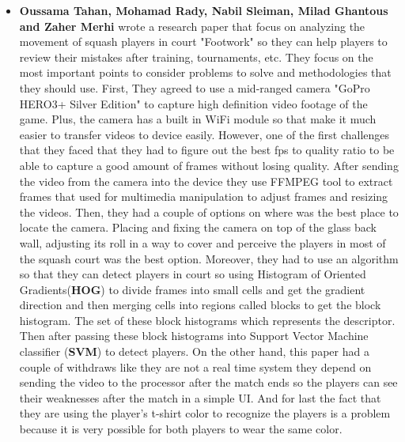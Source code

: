\documentclass[12pt]{article}
\begin{document}
\begin{itemize}
        \item \textbf{Oussama Tahan, Mohamad Rady, Nabil Sleiman, Milad Ghantous and Zaher Merhi }\cite{8379085}wrote a research paper that focus on analyzing the movement of squash players in court "Footwork" so they can help players to review their mistakes after training, tournaments, etc. They focus on the most important points to consider problems to solve and methodologies that they should use. First, They agreed to use a mid-ranged camera "GoPro HERO3+ Silver Edition" to capture high definition video footage of the game. Plus, the camera has a built in WiFi module so that make it much easier to transfer videos to device easily. However, one of the first challenges that they faced that they had to figure out the best fps to quality ratio to be able to capture a good amount of frames without losing quality. After sending the video from the camera into the device they use FFMPEG tool to extract frames that used for multimedia manipulation to adjust frames and resizing the videos. Then, they had a couple of options on where was the best place to locate the camera. Placing and fixing the camera on top of the glass back wall, adjusting its roll in a way to cover and perceive the players in most of the squash court was the best option. Moreover, they had to use an algorithm so that they can detect players in court so using  Histogram of Oriented Gradients(\textbf{HOG}) to divide frames into small cells and get the gradient direction and then merging cells into regions called blocks to get the block histogram. The set of these block histograms which represents the descriptor. Then after passing these block histograms into Support Vector Machine classifier (\textbf{SVM}) to detect players. On the other hand, this paper had a couple of withdraws like they are not a real time system they depend on sending the video to the processor after the match ends so the players can see their weaknesses after the match in a simple UI. And for last the fact that they are using the player's t-shirt color to recognize the players is a problem because it is very possible for both players to wear the same color. 
        \begin{figure}[H]
            \centering

\end{figure}
\end{itemize}
\end{document}
